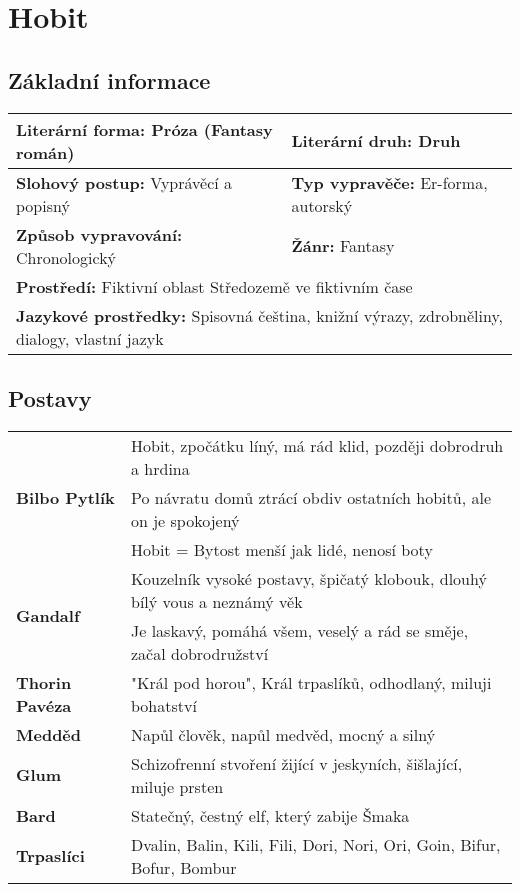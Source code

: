 \section{Hobit}
\label{sec:hobit}
\subsection*{Základní informace}
\begin{tabularx}{\linewidth}{l|l}
  \textbf{Literární forma:} Próza (Fantasy román) & \textbf{Literární druh:} Druh                                        \\
  \hline
  \textbf{Slohový postup:} Vyprávěcí a popisný    & \textbf{Typ vypravěče:} Er-forma, autorský                           \\
  \hline
  \textbf{Způsob vypravování:} Chronologický      & \textbf{Žánr:} Fantasy                                               \\
  \hline
  \multicolumn{2}{l}{\textbf{Prostředí:} Fiktivní oblast Středozemě ve fiktivním čase}                                   \\
  \hline
  \multicolumn{2}{l}{\textbf{Jazykové prostředky:} Spisovná čeština, knižní výrazy, zdrobněliny, dialogy, vlastní jazyk} \\
\end{tabularx}
\subsection*{Postavy}
\begin{tabularx}{\linewidth}{l|l}
  \multirow{3}{15em}{\textbf{Bilbo Pytlík}} & Hobit, zpočátku líný, má rád klid, později dobrodruh a hrdina             \\
                                            & Po návratu domů ztrácí obdiv ostatních hobitů, ale on je spokojený        \\
                                            & Hobit = Bytost menší jak lidé, nenosí boty                                \\
  \hline
  \multirow{2}{15em}{\textbf{Gandalf}}      & Kouzelník vysoké postavy, špičatý klobouk, dlouhý bílý vous a neznámý věk \\
                                            & Je laskavý, pomáhá všem, veselý a rád se směje, začal dobrodružství       \\
  \hline
  \textbf{Thorin Pavéza}                    & "Král pod horou", Král trpaslíků, odhodlaný, miluji bohatství             \\
  \hline
  \textbf{Medděd}                           & Napůl člověk, napůl medvěd, mocný a silný                                 \\
  \hline
  \textbf{Glum}                             & Schizofrenní stvoření žijící v jeskyních, šišlající, miluje prsten        \\
  \hline
  \textbf{Bard}                             & Statečný, čestný elf, který zabije Šmaka                                  \\
  \hline
  \textbf{Trpaslíci}                        & Dvalin, Balin, Kili, Fili, Dori, Nori, Ori, Goin, Bifur, Bofur, Bombur    \\
\end{tabularx}
